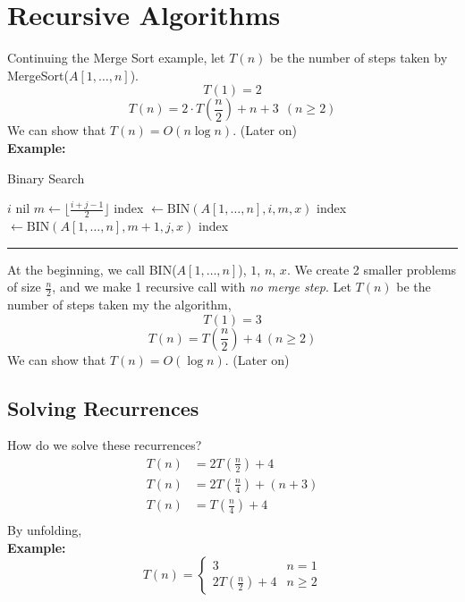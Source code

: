 \documentclass[openany]{report}
\begin{document}
\chapter{Recursive Algorithms}
Continuing the Merge Sort example, let $T(n)$ be the number of steps taken by MergeSort($A[1,\ldots,n]$). 
\[T(1) = 2\]
\[T(n) = 2 \cdot T\left(\frac{n}{2}\right) + n + 3 \ \ (n \geq 2)\]
We can show that $T(n) = O(n \log n)$. (Later on)\\[3ex]
\noindent
\textbf{Example:}
\begin{algorithm}
    \caption{Binary Search}
    \begin{algorithmic}
                \Return $i$
            \Else
                \Return nil
            \EndIf
        \Else
            \State $m \gets \lfloor \frac{i+j-1}{2} \rfloor$
                \State index $\gets \text{BIN}(A[1,\ldots,n], i, m, x)$
            \Else
                \State index $\gets \text{BIN}(A[1,\ldots,n], m+1, j, x)$
            \EndIf
        \Return index
        \EndIf
        \EndProcedure
    \end{algorithmic}
    \hrule
\end{algorithm}
At the beginning, we call BIN($A[1,\ldots,n]$), $1$, $n$, $x$. We create 2 smaller problems of size $\frac{n}{2}$, and we make 1 recursive call with \emph{no merge step}. Let $T(n)$ be the number of steps taken my the algorithm,
\[T(1) = 3\]
\[T(n) = T\left(\frac{n}{2}\right) + 4 \ (n \geq 2)\]
We can show that $T(n) = O(\log n)$. (Later on)\\[3ex]
\section{Solving Recurrences}
How do we solve these recurrences? 
\begin{align*}
    T(n) &= 2T \left(\frac{n}{2}\right) + 4\\
    T(n) &= 2T \left(\frac{n}{4}\right) + (n + 3)\\
    T(n) &= T \left(\frac{n}{4}\right) + 4\\
\end{align*}
By unfolding, \\[3ex]
\noindent
\textbf{Example:}
\[
    T(n) = 
\begin{cases}
    3 & n=1\\
    2T\left(\frac{n}{2}\right) + 4 & n \geq 2
\end{cases}    
\]
\end{document}

